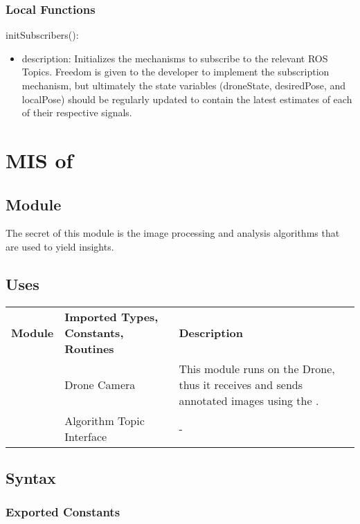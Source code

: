 \documentclass[12pt, titlepage]{article}
\begin{document}
\subsubsection{Local Functions}
\noindent initSubscribers():
\begin{itemize}
\item description: Initializes the mechanisms to subscribe to the relevant ROS Topics. Freedom is given to the developer to implement the subscription mechanism, but ultimately the state variables (droneState, desiredPose, and localPose) should be regularly updated to contain the latest estimates of each of their respective signals.
\end{itemize}
\newpage



\section{MIS of } \label{MIS_VISION_APP} 
\subsection{Module}
The secret of this module is the image processing and analysis algorithms that are used to yield insights.
\subsection{Uses}
\begin{center}
\begin{tabular}{p{2 cm} p{5cm} p{6.5cm} } 
\hline
\textbf{Module} & \textbf{Imported Types, Constants, Routines} & \textbf{Description} \\
\nameref{Drone Camera} & Drone Camera & This module runs on the Drone, thus it receives and sends annotated images using the \nameref{Drone Camera}. \\
\nameref{Algorithm Topic Interface} & Algorithm Topic Interface & - \\
\hline
\hline
\end{tabular}
\end{center}
\subsection{Syntax}
\subsubsection{Exported Constants}
\end{document}
